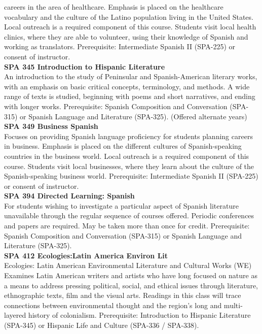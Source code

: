 \documentclass[
  letterpaper,
]{scrbook}
\begin{document}
careers in the area of healthcare. Emphasis is placed on the healthcare
vocabulary and the culture of the Latino population living in the United
States. Local outreach is a required component of this course. Students
visit local health clinics, where they are able to volunteer, using
their knowledge of Spanish and working as translators. Prerequisite:
Intermediate Spanish II (SPA-225) or consent of instructor.\\
\textbf{SPA 345 Introduction to Hispanic Literature}\\
An introduction to the study of Peninsular and Spanish-American literary
works, with an emphasis on basic critical concepts, terminology, and
methods. A wide range of texts is studied, beginning with poems and
short narratives, and ending with longer works. Prerequisite: Spanish
Composition and Conversation (SPA-315) or Spanish Language and
Literature (SPA-325). (Offered alternate years)\\
\textbf{SPA 349 Business Spanish}\\
Focuses on providing Spanish language proficiency for students planning
careers in business. Emphasis is placed on the different cultures of
Spanish-speaking countries in the business world. Local outreach is a
required component of this course. Students visit local businesses,
where they learn about the culture of the Spanish-speaking business
world. Prerequisite: Intermediate Spanish II (SPA-225) or consent of
instructor.\\
\textbf{SPA 394 Directed Learning: Spanish}\\
For students wishing to investigate a particular aspect of Spanish
literature unavailable through the regular sequence of courses offered.
Periodic conferences and papers are required. May be taken more than
once for credit. Prerequisite: Spanish Composition and Conversation
(SPA-315) or Spanish Language and Literature (SPA-325).\\
\textbf{SPA 412 Ecologies:Latin America Environ Lit}\\
Ecologies: Latin American Environmental Literature and Cultural Works
(WE) Examines Latin American writers and artists who have long focused
on nature as a means to address pressing political, social, and ethical
issues through literature, ethnographic texts, film and the visual arts.
Readings in this class will trace connections between environmental
thought and the region's long and multi-layered history of colonialism.
Prerequisite: Introduction to Hispanic Literature (SPA-345) or Hispanic
Life and Culture (SPA-336 / SPA-338).\\
\end{document}

